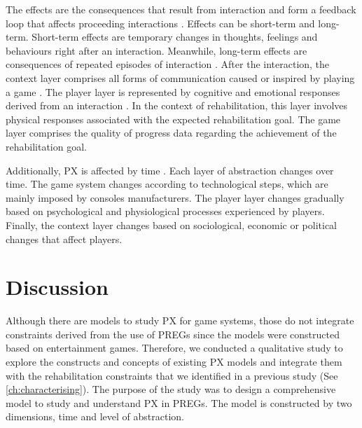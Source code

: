 The effects are the consequences that result from interaction \autocite{Fernandez2008} and form a feedback loop that affects proceeding interactions \autocite{Nacked,Elson2014}. Effects can be short-term and long-term. Short-term effects are temporary changes in thoughts, feelings and behaviours right after an interaction. Meanwhile, long-term effects are consequences of repeated episodes of interaction \autocite{Elson2014}. After the interaction, the context layer comprises all forms of communication caused or inspired by playing a game \autocite{Elson2014}. The player layer is represented by cognitive and emotional responses derived from an interaction \autocite{Fernandez2008}. In the context of rehabilitation, this layer involves physical responses associated with the expected rehabilitation goal. The game layer comprises the quality of progress data regarding the achievement of the rehabilitation goal.

Additionally, \ac{PX} is affected by time \autocite{Nackea2}. Each layer of abstraction changes over time. The game system changes according to technological steps, which are mainly imposed by consoles manufacturers. The player layer changes gradually based on psychological and physiological processes experienced by players. Finally, the context layer changes based on sociological, economic or political changes that affect players.

\section{Discussion} %
\label{sec:discussion_model}
Although there are models to study \ac{PX} for game systems, those do not integrate constraints derived from the use of \acp{PREG} since the models were constructed based on entertainment games. Therefore, we conducted a qualitative study to explore the constructs and concepts of existing \ac{PX} models and integrate them with the rehabilitation constraints that we identified in a previous study (See \autoref{ch:characterising}). The purpose of the study was to design a comprehensive model to study and understand \ac{PX} in \acp{PREG}. The model is constructed by two dimensions, time and level of abstraction. 


